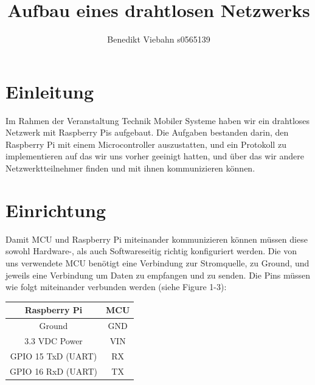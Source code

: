 \documentclass[12pt, a4paper]{article}
\title{Aufbau eines drahtlosen Netzwerks}
\author{Benedikt Viebahn s0565139}
\begin{document}
\maketitle
\tableofcontents 
\newpage
\section{Einleitung}
Im Rahmen der Veranstaltung Technik Mobiler Systeme haben wir 
ein drahtloses Netzwerk mit Raspberry Pis aufgebaut. Die Aufgaben bestanden 
darin, den Raspberry Pi mit einem Microcontroller auszustatten, 
und ein Protokoll zu implementieren auf das wir uns vorher geeinigt hatten,
und über das wir andere Netzwerktteilnehmer
finden und mit ihnen kommunizieren können. 

\section{Einrichtung}
Damit MCU und Raspberry Pi miteinander kommunizieren können 
müssen diese sowohl Hardware-, als auch Softwareseitig 
richtig konfiguriert werden.
Die von uns verwendete MCU benötigt eine Verbindung zur Stromquelle,
zu Ground, und jeweils eine Verbindung um Daten zu empfangen und zu senden.
Die Pins müssen wie folgt miteinander verbunden werden (siehe Figure 1-3):
\begin{center}
    \begin{tabular}{|c|c|}
        \hline
        Raspberry Pi & MCU \\ [0.5ex]
        \hline\hline
        Ground & GND \\
        \hline
        3.3 VDC Power & VIN \\
        \hline
        GPIO 15 TxD (UART) & RX \\
        \hline
        GPIO 16 RxD (UART) & TX \\
        \hline
    \end{tabular}
\end{center}
\end{document}
